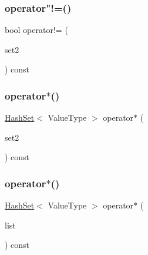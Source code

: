 \subsubsection{\texorpdfstring{operator"!=()}{operator!=()}}
{\footnotesize\ttfamily bool operator!= (\begin{DoxyParamCaption}\item[{const \mbox{\hyperlink{classHashSet}{Hash\+Set}}$<$ Value\+Type $>$ \&}]{set2 }\end{DoxyParamCaption}) const}

\mbox{\label{classHashSet_a0baed135da0add94fe4872ad8e7156ad}} 
\subsubsection{\texorpdfstring{operator$\ast$()}{operator*()}\hspace{0.1cm}{\footnotesize\ttfamily [1/2]}}
{\footnotesize\ttfamily \mbox{\hyperlink{classHashSet}{Hash\+Set}}$<$ Value\+Type $>$ operator$\ast$ (\begin{DoxyParamCaption}\item[{const \mbox{\hyperlink{classHashSet}{Hash\+Set}}$<$ Value\+Type $>$ \&}]{set2 }\end{DoxyParamCaption}) const}

\mbox{\label{classHashSet_ac58647555d640e08d77b282487762f3c}} 
\subsubsection{\texorpdfstring{operator$\ast$()}{operator*()}\hspace{0.1cm}{\footnotesize\ttfamily [2/2]}}
{\footnotesize\ttfamily \mbox{\hyperlink{classHashSet}{Hash\+Set}}$<$ Value\+Type $>$ operator$\ast$ (\begin{DoxyParamCaption}\item[{std\+::initializer\+\_\+list$<$ Value\+Type $>$}]{list }\end{DoxyParamCaption}) const}

\mbox{\label{classHashSet_a87bb5997cef7635bd299a5dc2d3ad4d1}} 
